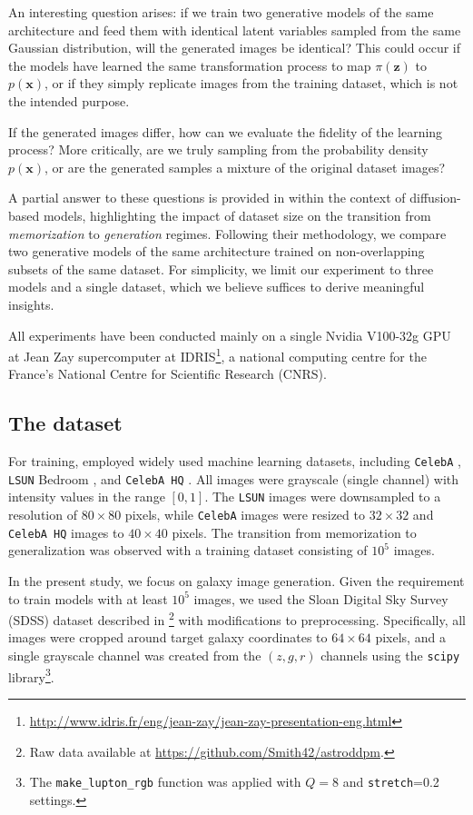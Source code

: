 \documentclass[fleqn,usenatbib]{mnras}
\begin{document}
An interesting question arises: if we train two generative models of the same architecture and feed them with identical latent variables sampled from the same Gaussian distribution, will the generated images be identical? This could occur if the models have learned the same transformation process to map $\pi(\bm{z})$ to $p(\bm{x})$, or if they simply replicate images from the training dataset, which is not the intended purpose. 

If the generated images differ, how can we evaluate the fidelity of the learning process? More critically, are we truly sampling from the probability density $p(\bm{x})$, or are the generated samples a mixture of the original dataset images?

A partial answer to these questions is provided in \cite{kadkhodaie2024generalization} within the context of diffusion-based models, highlighting the impact of dataset size on the transition from \textit{memorization} to \textit{generation} regimes. Following their methodology, we compare two generative models of the same architecture trained on non-overlapping subsets of the same dataset. For simplicity, we limit our experiment to three models and a single dataset, which we believe suffices to derive meaningful insights.

All experiments have been conducted mainly on a single Nvidia V100-32g GPU at Jean Zay supercomputer at IDRIS\footnote{\url{http://www.idris.fr/eng/jean-zay/jean-zay-presentation-eng.html}}, a national computing centre for the France's National Centre for Scientific Research (CNRS).
%

\subsection{The dataset}
\label{sec-Dataset}
%
For training, \cite{kadkhodaie2024generalization} employed widely used machine learning datasets, including \texttt{CelebA} \citep{Liu2015}, \texttt{LSUN} Bedroom \citep{Yu2015}, and \texttt{CelebA HQ} \citep{KarrasALL18}. All images were grayscale (single channel) with intensity values in the range $[0,1]$. The \texttt{LSUN} images were downsampled to a resolution of $80 \times 80$ pixels, while \texttt{CelebA} images were resized to $32 \times 32$ and \texttt{CelebA HQ} images to $40 \times 40$ pixels. The transition from memorization to generalization was observed with a training dataset consisting of $10^5$ images.

In the present study, we focus on galaxy image generation. Given the requirement to train models with at least $10^5$ images, we used the Sloan Digital Sky Survey (SDSS) dataset described in \citep{smith2021}\footnote{Raw data available at \url{https://github.com/Smith42/astroddpm}.} with modifications to preprocessing. Specifically, all images were cropped around target galaxy coordinates to $64 \times 64$ pixels, and a single grayscale channel was created from the $(z, g, r)$ channels using the \texttt{scipy} \citep{2020SciPy-NMeth} library\footnote{The \texttt{make\_lupton\_rgb} function was applied with $Q=8$ and \texttt{stretch}=0.2 settings.}. 
%
\end{document}
